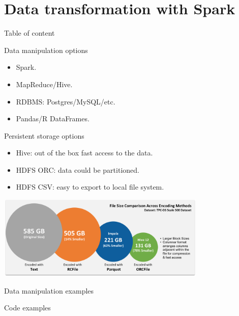 \documentclass[unicode, notheorems]{beamer}
\begin{document}
\section{Data transformation with Spark}
\begin{frame}{Table of content}
\tableofcontents[currentsection]
\end{frame}
\begin{frame}{Data manipulation options}
\begin{itemize}
\item Spark.
\item MapReduce/Hive.
\item RDBMS: Postgres/MySQL/etc.
\item Pandas/R DataFrames.
\end{itemize}
\end{frame}

\begin{frame}{Persistent storage options}
\begin{itemize}
\item Hive: out of the box fast access to the data.
\item HDFS ORC: data could be partitioned.
\item HDFS CSV: easy to export to local file system.
\end{itemize}
\begin{center}
	\includegraphics[width=10cm, height=4cm]{images/storage-formats}
\end{center}
\end{frame}


\begin{frame}{Data manipulation examples}
\begin{center}
{\huge Code examples} \\
\end{center}
\end{frame}
\end{document}
